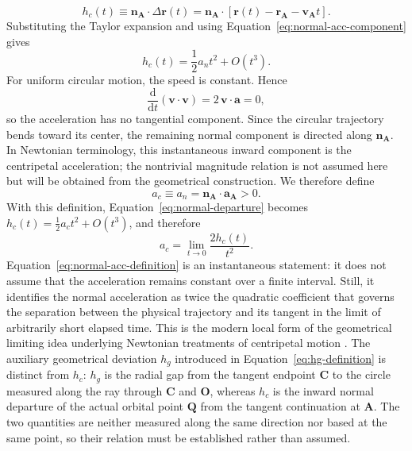 \documentclass[preprint,12pt,3p,nopreprintline]{elsarticle}
\newcommand{\dd}{\mathrm{d}}
\newcommand{\pt}[1]{\mathbf{#1}}
\newcommand{\be}{\begin{equation}}
\newcommand{\ee}{\end{equation}}
\numberwithin{equation}{section}
\theoremstyle{remark}
\begin{document}
\be
h_c(t)\equiv\mathbf{n}_{\pt{A}}\!\cdot\!\Delta\mathbf{r}(t)
=\mathbf{n}_{\pt{A}}\!\cdot\!\left[\mathbf{r}(t)-\mathbf{r}_{\pt{A}}-\mathbf{v}_{\pt{A}}t\right].
\label{eq:normal-departure-definition}
\ee
Substituting the Taylor expansion and using Equation~\eqref{eq:normal-acc-component} gives
\be
h_c(t)=\frac{1}{2}a_n t^2+O(t^3).
\label{eq:normal-departure}
\ee
For uniform circular motion, the speed is constant. Hence
\be
\frac{\dd}{\dd t}\!\left(\mathbf{v}\!\cdot\!\mathbf{v}\right)
=2\,\mathbf{v}\!\cdot\!\mathbf{a}=0,
\label{eq:constant-speed-orthogonality}
\ee
so the acceleration has no tangential component. Since the circular trajectory bends toward its center, the remaining normal component is directed along $\mathbf{n}_{\pt{A}}$. In Newtonian terminology, this instantaneous inward component is the centripetal acceleration; the nontrivial magnitude relation is not assumed here but will be obtained from the geometrical construction. We therefore define
\be
 a_c\equiv a_n=\mathbf{n}_{\pt{A}}\!\cdot\!\mathbf{a}_{\pt{A}}>0.
\label{eq:centripetal-definition}
\ee
With this definition, Equation~\eqref{eq:normal-departure} becomes $h_c(t)=\tfrac12 a_c t^2+O(t^3)$, and therefore
\be
 a_c=\lim_{t\to0}\frac{2h_c(t)}{t^2}.
\label{eq:normal-acc-definition}
\ee
Equation~\eqref{eq:normal-acc-definition} is an instantaneous statement: it does not assume that the acceleration remains constant over a finite interval. Still, it identifies the normal acceleration as twice the quadratic coefficient that governs the separation between the physical trajectory and its tangent in the limit of arbitrarily short elapsed time. This is the modern local form of the geometrical limiting idea underlying Newtonian treatments of centripetal motion \cite{newton1729principia,erlichson1991motive}. The auxiliary geometrical deviation $h_g$ introduced in Equation~\eqref{eq:hg-definition} is distinct from $h_c$: $h_g$ is the radial gap from the tangent endpoint $\pt{C}$ to the circle measured along the ray through $\pt{C}$ and $\pt{O}$, whereas $h_c$ is the inward normal departure of the actual orbital point $\pt{Q}$ from the tangent continuation at $\pt{A}$. The two quantities are neither measured along the same direction nor based at the same point, so their relation must be established rather than assumed.
\end{document}
